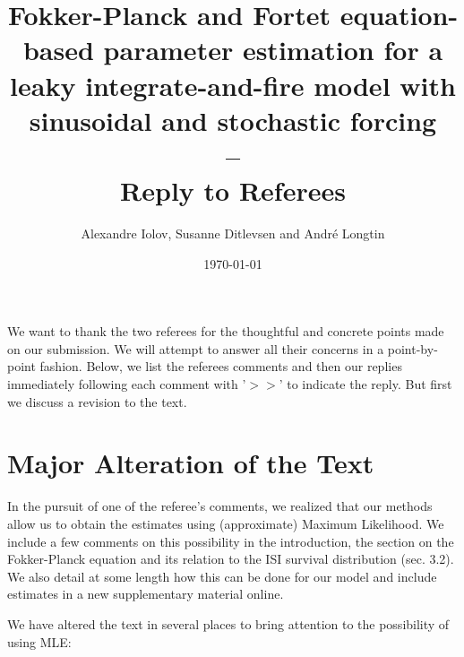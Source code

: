 \documentclass{article}
\begin{document}
\title{Fokker-Planck and Fortet equation-based parameter estimation for a
leaky integrate-and-fire model with sinusoidal and stochastic forcing
\\
--\\
Reply to Referees} 

\author{Alexandre Iolov, 
Susanne Ditlevsen 
and
Andr\'e Longtin
}

\date{\today}

\maketitle 



\vskip 20pt

We want to thank the two referees for the thoughtful and concrete points made on
our submission. We will attempt to answer all their concerns in a point-by-point
fashion. Below, we list the referees comments and then our replies immediately
following each comment with '$>>$' to indicate the reply. But first we discuss
a revision to the text.


\section{Major Alteration of the Text}
In the pursuit of one of the referee's comments, we realized that our methods
allow us to obtain the estimates using (approximate) Maximum
Likelihood. We include a few comments on this possibility in the introduction,
the section on the Fokker-Planck equation and its relation to the ISI survival
distribution (sec. 3.2). We also detail at some length how this can be done
for our model and include estimates in a new supplementary material online.

We have altered the text in several places to bring attention to the possibility
of using MLE:
\end{document}
